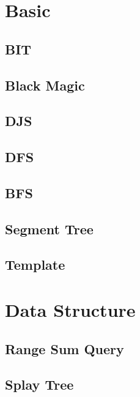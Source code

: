\section{Basic}
    \subsection{BIT}
        
    \subsection{Black Magic}
        
    \subsection{DJS}
        
    \subsection{DFS}
        
    \subsection{BFS}
        
    \subsection{Segment Tree}
        
    \subsection{Template}
        

\section{Data Structure}
    \subsection{Range Sum Query}
        
    \subsection{Splay Tree}
        

